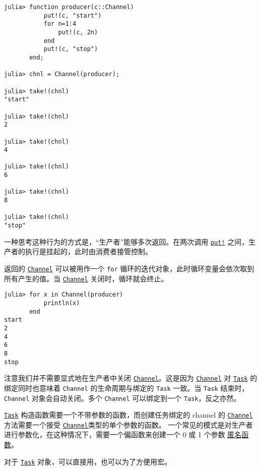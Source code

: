 \begin{verbatim}
julia> function producer(c::Channel)
           put!(c, "start")
           for n=1:4
               put!(c, 2n)
           end
           put!(c, "stop")
       end;

julia> chnl = Channel(producer);

julia> take!(chnl)
"start"

julia> take!(chnl)
2

julia> take!(chnl)
4

julia> take!(chnl)
6

julia> take!(chnl)
8

julia> take!(chnl)
"stop"
\end{verbatim}



一种思考这种行为的方式是，“生产者”能够多次返回。在两次调用 \hyperlink{10812715779190652189}{\texttt{put!}} 之间，生产者的执行是挂起的，此时由消费者接管控制。



返回的 \hyperlink{12548845729684045604}{\texttt{Channel}} 可以被用作一个 \texttt{for} 循环的迭代对象，此时循环变量会依次取到所有产生的值。当 \hyperlink{12548845729684045604}{\texttt{Channel}} 关闭时，循环就会终止。




\begin{verbatim}
julia> for x in Channel(producer)
           println(x)
       end
start
2
4
6
8
stop
\end{verbatim}



注意我们并不需要显式地在生产者中关闭 \hyperlink{12548845729684045604}{\texttt{Channel}}。这是因为 \hyperlink{12548845729684045604}{\texttt{Channel}} 对 \hyperlink{7131243650304654155}{\texttt{Task}} 的绑定同时也意味着 \texttt{Channel} 的生命周期与绑定的 \texttt{Task} 一致。当 \texttt{Task} 结束时，\texttt{Channel} 对象会自动关闭。多个 \texttt{Channel} 可以绑定到一个 \texttt{Task}，反之亦然。



\hyperlink{7131243650304654155}{\texttt{Task}} 构造函数需要一个不带参数的函数，而创建任务绑定的 channel 的 \hyperlink{12548845729684045604}{\texttt{Channel}} 方法需要一个接受 \hyperlink{12548845729684045604}{\texttt{Channel}}类型的单个参数的函数。 一个常见的模式是对生产者进行参数化，在这种情况下，需要一个偏函数来创建一个 0 或 1 个参数 \hyperlink{5206910466103540848}{匿名函数}。



对于 \hyperlink{7131243650304654155}{\texttt{Task}} 对象，可以直接用，也可以为了方便用宏。




